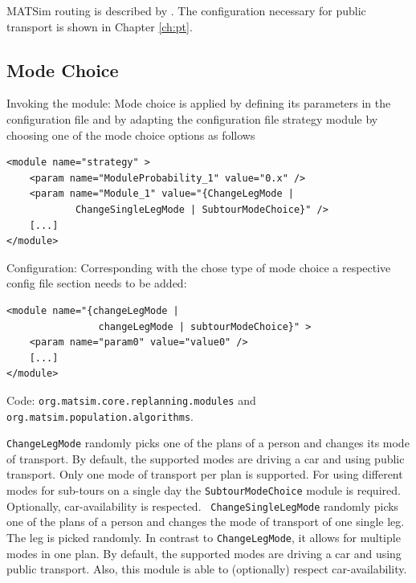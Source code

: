 MATSim routing is described by \citet[]{LefebvreBalmer_STRC_2007, LefebvreBalmer_TechRep_IVT_2007}. The configuration necessary for public transport is shown in Chapter \ref{ch:pt}.

\subsection{Mode Choice}
\label{sec:modechoice}
\begin{compactitem}
\item Invoking the module: Mode choice is applied by defining its parameters in the configuration file and by adapting the configuration file strategy module by choosing one of the mode choice options as follows
\begin{lstlisting}
<module name="strategy" >
    <param name="ModuleProbability_1" value="0.x" />
    <param name="Module_1" value="{ChangeLegMode |
    		ChangeSingleLegMode | SubtourModeChoice}" />
    [...]
</module>
\end{lstlisting}
%
\item Configuration: Corresponding with the chose type of mode choice a respective config file section needs to be added:
%
\begin{lstlisting}
<module name="{changeLegMode |
				changeLegMode | subtourModeChoice}" >
    <param name="param0" value="value0" />
    [...]
</module>
\end{lstlisting}
%
\item Code: \lstinline|org.matsim.core.replanning.modules| and \lstinline|org.matsim.population.algorithms|.
\end{compactitem}

\lstinline|ChangeLegMode| randomly picks one of the plans of a person and changes its mode of transport. By default, the supported modes are driving a car and using public transport. Only one mode of transport per plan is supported. For using different modes for sub-tours on a single day the \lstinline|SubtourModeChoice| module is required. Optionally, car-availability is respected. \lstinline| ChangeSingleLegMode| randomly picks one of the plans of a person and changes the mode of transport of one single leg. The leg is picked randomly. In contrast to \lstinline|ChangeLegMode|, it allows for multiple modes in one plan. By default, the supported modes are driving a car and using public transport. Also, this module is able to (optionally) respect car-availability.

